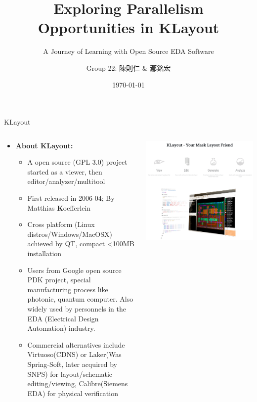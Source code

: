 \documentclass[aspectratio=169]{beamer} %
\title{Exploring Parallelism Opportunities in KLayout}
\subtitle{A Journey of Learning with Open Source EDA Software}
\author{Group 22: 陳則仁 \& 鄢銘宏}
\date{\today}
\begin{document}
\begin{frame}
    \titlepage
\end{frame}
    
\begin{frame}{KLayout}
    \begin{columns}[T]
        \begin{column}{.6\textwidth}
        \begin{itemize}
            \item \textbf{About KLayout:}
                \begin{itemize}
                    \item A open source (GPL 3.0) project started as a viewer, then editor/analyzer/multitool 
                    \item First released in 2006-04; By Matthias \textbf{K}oefferlein
                    \item Cross platform (Linux distros/Windows/MacOSX) achieved by QT, compact  <100MB installation
                    \item Users from Google open source PDK project, special manufacturing process like photonic, quantum computer. Also widely used by personnels in the EDA (Electrical Design Automation) industry.
                    \item Commercial alternatives include Virtuoso(CDNS) or Laker(Was Spring-Soft, later acquired by SNPS) for layout/schematic editing/viewing, Calibre(Siemens EDA) for physical verification
                \end{itemize}
        \end{itemize}
        \end{column}
        \begin{column}{.4\textwidth}
        \includegraphics[width=\textwidth,height=\textheight,keepaspectratio]{klayout.png}
        \end{column}
    \end{columns}
\end{frame}
\end{document}
